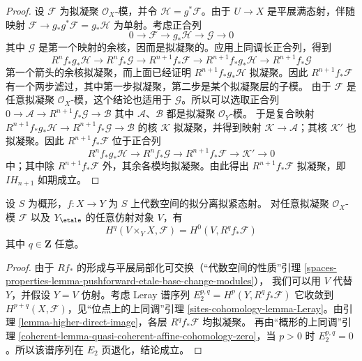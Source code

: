 \begin{proof}
\medskip\noindent
设 $\mathcal{F}$ 为拟凝聚 $\mathcal{O}_X$-模，并令
$\mathcal{H} = g^*\mathcal{F}$。由于 $U \to X$ 是平展满态射，伴随映射
$\mathcal{F} \to g_*g^*\mathcal{F} = g_*\mathcal{H}$ 为单射。考虑正合列
$$
0 \to \mathcal{F} \to g_*\mathcal{H} \to \mathcal{G} \to 0
$$
其中 $\mathcal{G}$ 是第一个映射的余核，因而是拟凝聚的。应用上同调长正合列，得到
$$
R^nf_*g_*\mathcal{H} \to
R^nf_*\mathcal{G} \to
R^{n + 1}f_*\mathcal{F} \to
R^{n + 1}f_*g_*\mathcal{H} \to
R^{n + 1}f_*\mathcal{G}
$$
第一个箭头的余核拟凝聚，而上面已经证明
$R^{n + 1}f_*g_*\mathcal{H}$ 拟凝聚。因此 $R^{n + 1}f_*\mathcal{F}$
有一个两步滤过，其中第一步拟凝聚，第二步是某个拟凝聚层的子模。
由于 $\mathcal{F}$ 是任意拟凝聚 $\mathcal{O}_X$-模，这个结论也适用于
$\mathcal{G}$。所以可以选取正合列
$0 \to \mathcal{A} \to R^{n + 1}f_*\mathcal{G} \to \mathcal{B}$
其中 $\mathcal{A}$、$\mathcal{B}$ 都是拟凝聚 $\mathcal{O}_Y$-模。
于是复合映射
$R^{n + 1}f_*g_*\mathcal{H} \to R^{n + 1}f_*\mathcal{G}
\to \mathcal{B}$ 的核 $\mathcal{K}$ 拟凝聚，并得到映射
$\mathcal{K} \to \mathcal{A}$；其核 $\mathcal{K}'$ 也拟凝聚。因此
$R^{n + 1}f_*\mathcal{F}$ 位于正合列
$$
R^nf_*g_*\mathcal{H} \to
R^nf_*\mathcal{G} \to
R^{n + 1}f_*\mathcal{F} \to \mathcal{K}' \to 0
$$
中；其中除 $R^{n + 1}f_*\mathcal{F}$ 外，其余各模均拟凝聚。由此得出
$R^{n + 1}f_*\mathcal{F}$ 拟凝聚，即 $IH_{n + 1}$ 如期成立。
\end{proof}

\begin{lemma}
\label{lemma-quasi-coherence-higher-direct-images-application}
设 $S$ 为概形，$f : X \to Y$ 为 $S$ 上代数空间的拟分离拟紧态射。
对任意拟凝聚 $\mathcal{O}_X$-模 $\mathcal{F}$ 以及 $Y_\etale$ 的任意仿射对象
$V$，有
$$
H^q(V \times_Y X, \mathcal{F}) = H^0(V, R^qf_*\mathcal{F})
$$
其中 $q \in \mathbf{Z}$ 任意。
\end{lemma}

\begin{proof}
由于 $Rf_*$ 的形成与平展局部化可交换（“代数空间的性质”引理
\ref{spaces-properties-lemma-pushforward-etale-base-change-modules}），
我们可以用 $V$ 代替 $Y$，并假设 $Y = V$ 仿射。考虑 Leray 谱序列
$E_2^{p, q} = H^p(Y, R^qf_*\mathcal{F})$
它收敛到 $H^{p + q}(X, \mathcal{F})$，见“位点上的上同调”引理
\ref{sites-cohomology-lemma-Leray}。由引理
\ref{lemma-higher-direct-image}，各层 $R^qf_*\mathcal{F}$ 均拟凝聚。
再由“概形的上同调”引理
\ref{coherent-lemma-quasi-coherent-affine-cohomology-zero}，当 $p > 0$ 时
$E_2^{p, q} = 0$。所以该谱序列在 $E_2$ 页退化，结论成立。
\end{proof}




